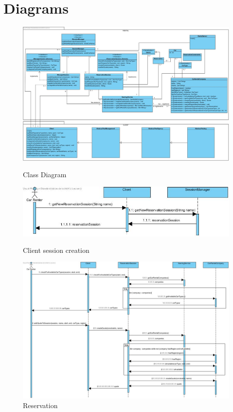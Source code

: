 \documentclass[]{article}
\begin{document}
\section{Diagrams}
{\begin{figure}[h]
		\caption{Class Diagram}
		\includegraphics[width=1\textwidth]{classdiagram}
		\label{fig:class}
	\end{figure}
\clearpage
{\begin{figure}[h]
		\caption{Client session creation}
		\includegraphics[width=1\textwidth]{clientseq}
		\label{fig:client}
	\end{figure}
{\begin{figure}[h]
		\caption{Reservation}
		\includegraphics[width=1\textwidth]{reservationseq}

\end{figure}}}}
\end{document}
